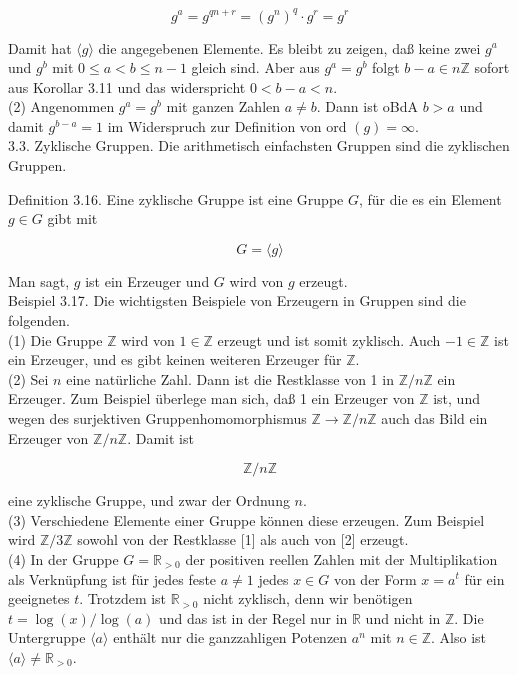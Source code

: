 \documentclass[10pt, letterpaper]{article}
\begin{document}
$$
g^{a}=g^{q n+r}=\left(g^{n}\right)^{q} \cdot g^{r}=g^{r}
$$

Damit hat $\langle g\rangle$ die angegebenen Elemente. Es bleibt zu zeigen, daß keine zwei $g^{a}$ und $g^{b}$ mit $0 \leq a<b \leq n-1$ gleich sind. Aber aus $g^{a}=g^{b}$ folgt $b-a \in n \mathbb{Z}$ sofort aus Korollar 3.11 und das widerspricht $0<b-a<n$.\\
(2) Angenommen $g^{a}=g^{b}$ mit ganzen Zahlen $a \neq b$. Dann ist oBdA $b>a$ und damit $g^{b-a}=1$ im Widerspruch zur Definition von ord $(g)=\infty$.\\
3.3. Zyklische Gruppen. Die arithmetisch einfachsten Gruppen sind die zyklischen Gruppen.

Definition 3.16. Eine zyklische Gruppe ist eine Gruppe $G$, für die es ein Element $g \in G$ gibt mit

$$
G=\langle g\rangle
$$

Man sagt, $g$ ist ein Erzeuger und $G$ wird von $g$ erzeugt.\\
Beispiel 3.17. Die wichtigsten Beispiele von Erzeugern in Gruppen sind die folgenden.\\
(1) Die Gruppe $\mathbb{Z}$ wird von $1 \in \mathbb{Z}$ erzeugt und ist somit zyklisch. Auch $-1 \in \mathbb{Z}$ ist ein Erzeuger, und es gibt keinen weiteren Erzeuger für $\mathbb{Z}$.\\
(2) Sei $n$ eine natürliche Zahl. Dann ist die Restklasse von 1 in $\mathbb{Z} / n \mathbb{Z}$ ein Erzeuger. Zum Beispiel überlege man sich, daß 1 ein Erzeuger von $\mathbb{Z}$ ist, und wegen des surjektiven Gruppenhomomorphismus $\mathbb{Z} \rightarrow \mathbb{Z} / n \mathbb{Z}$ auch das Bild ein Erzeuger von $\mathbb{Z} / n \mathbb{Z}$. Damit ist

$$
\mathbb{Z} / n \mathbb{Z}
$$

eine zyklische Gruppe, und zwar der Ordnung $n$.\\
(3) Verschiedene Elemente einer Gruppe können diese erzeugen. Zum Beispiel wird $\mathbb{Z} / 3 \mathbb{Z}$ sowohl von der Restklasse [1] als auch von [2] erzeugt.\\
(4) In der Gruppe $G=\mathbb{R}_{>0}$ der positiven reellen Zahlen mit der Multiplikation als Verknüpfung ist für jedes feste $a \neq 1$ jedes $x \in G$ von der Form $x=a^{t}$ für ein geeignetes $t$. Trotzdem ist $\mathbb{R}_{>0}$ nicht zyklisch, denn wir benötigen $t=\log (x) / \log (a)$ und das ist in der Regel nur in $\mathbb{R}$ und nicht in $\mathbb{Z}$. Die Untergruppe $\langle a\rangle$ enthält nur die ganzzahligen Potenzen $a^{n}$ mit $n \in \mathbb{Z}$. Also ist $\langle a\rangle \neq \mathbb{R}_{>0}$.
\end{document}
